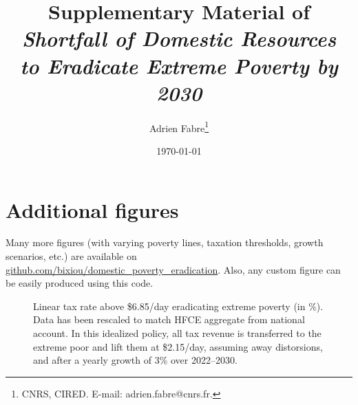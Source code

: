 \documentclass[12pt,english]{article}
\title{Supplementary Material of\\\textit{Shortfall of Domestic Resources\\ to Eradicate Extreme Poverty by 2030}}
\author{Adrien Fabre\footnote{CNRS, CIRED. E-mail: adrien.fabre@cnrs.fr.}}
\date{\today} %
\begin{document}
\sloppy
\maketitle

\listoftables
\listoffigures

\appendix %
\renewcommand{\thetable}{A\arabic{table}}
\renewcommand{\thefigure}{A\arabic{figure}}
\setcounter{figure}{0}
\setcounter{table}{0}

\clearpage
\section{Additional figures}

Many more figures (with varying poverty lines, taxation thresholds, growth scenarios, etc.) are available on \href{https://github.com/bixiou/domestic_poverty_eradication/tree/main/figures}{github.com/bixiou/domestic\_poverty\_eradication}. Also, any custom figure can be easily produced using this code.



\begin{figure}[!htb]
  \caption[Anti-extreme-poverty tax above \$6.85/day after 3\% growth (HFCE-scaled).]{Linear tax rate above \$6.85/day eradicating extreme poverty (in \%). Data has been rescaled to match HFCE aggregate from national account. In this idealized policy, all tax revenue is transferred to the extreme poor and lift them at \$2.15/day, assuming away distorsions, and after a yearly growth of 3\% over 2022--2030. 
  }\label{fig:s_antipoverty_2_tax_7_average}
\end{figure}
\end{document}
